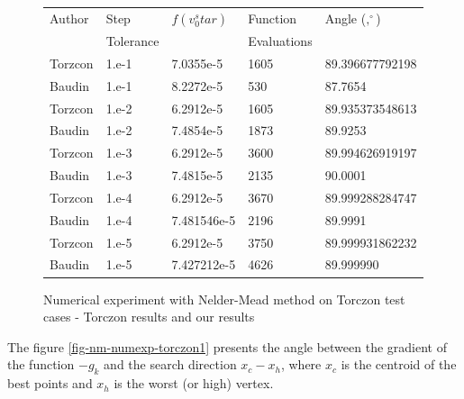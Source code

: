 \begin{figure}[htbp]
\begin{center}
\begin{tiny}
\begin{tabular}{|l|l|l|l|l|}
\hline
Author & Step & $f(v_0^star)$ & Function & Angle ($,^{\circ}$)\\
& Tolerance & & Evaluations & \\
\hline
Torzcon & 1.e-1 & 7.0355e-5 & 1605 & 89.396677792198 \\
Baudin  & 1.e-1 & 8.2272e-5 & 530  & 87.7654 \\
\hline
Torzcon & 1.e-2 & 6.2912e-5 & 1605 & 89.935373548613 \\
Baudin  & 1.e-2 & 7.4854e-5 & 1873 & 89.9253 \\
\hline
Torzcon & 1.e-3 & 6.2912e-5 & 3600 & 89.994626919197 \\
Baudin  & 1.e-3 & 7.4815e-5 & 2135 & 90.0001 \\
\hline
Torzcon & 1.e-4 & 6.2912e-5 & 3670 & 89.999288284747 \\
Baudin  & 1.e-4 & 7.481546e-5 & 2196 & 89.9991 \\
\hline
Torzcon & 1.e-5 & 6.2912e-5 & 3750 & 89.999931862232 \\
Baudin  & 1.e-5 & 7.427212e-5 & 4626 & 89.999990 \\
\hline
\end{tabular}
\end{tiny}
\end{center}
\caption{Numerical experiment with Nelder-Mead method on Torczon test cases - 
Torczon results and our results}
\label{fig-nm-torczon-table}
\end{figure}

The figure \ref{fig-nm-numexp-torczon1} presents the 
angle between the gradient of the function $-g_k$ and the search 
direction $x_c - x_h$, where $x_c$ is the centroid of the best 
points and $x_h$ is the worst (or high) vertex.

